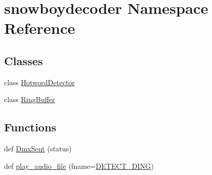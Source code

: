\hypertarget{namespacesnowboydecoder}{}\section{snowboydecoder Namespace Reference}
\label{namespacesnowboydecoder}
\subsection*{Classes}
\begin{DoxyCompactItemize}
\item 
class \hyperlink{classsnowboydecoder_1_1HotwordDetector}{Hotword\+Detector}
\item 
class \hyperlink{classsnowboydecoder_1_1RingBuffer}{Ring\+Buffer}
\end{DoxyCompactItemize}
\subsection*{Functions}
\begin{DoxyCompactItemize}
\item 
def \hyperlink{namespacesnowboydecoder_a3e81abf57add5fcaf5b558209528abe8}{Dmx\+Sent} (status)
\item 
def \hyperlink{namespacesnowboydecoder_a828506a06fcca3526430747208f904aa}{play\+\_\+audio\+\_\+file} (fname=\hyperlink{namespacesnowboydecoder_ae78f17cd44cb19906efdf4e4b57f1553}{D\+E\+T\+E\+C\+T\+\_\+\+D\+I\+NG})
\end{DoxyCompactItemize}
